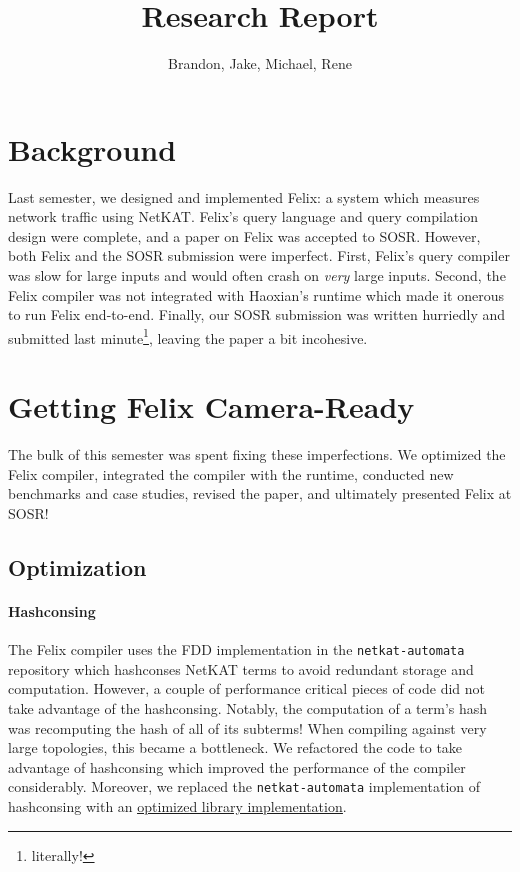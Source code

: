 \documentclass{hw}
\title{Research Report}
\author{Brandon, Jake, Michael, Rene}
\newcommand{\netauto}{\texttt{netkat-automata}}
\newcommand{\niceref}[2]{\underline{\textcolor{blue}{\href{#1}{#2}}}}
\begin{document}
\maketitle

\section{Background}
Last semester, we designed and implemented Felix: a system which measures
network traffic using NetKAT. Felix's query language and query compilation
design were complete, and a paper on Felix was accepted to SOSR. However,
both Felix and the SOSR submission were imperfect. First, Felix's query
compiler was slow for large inputs and would often crash on \emph{very} large
inputs. Second, the Felix compiler was not integrated with Haoxian's runtime
which made it onerous to run Felix end-to-end. Finally, our SOSR submission was
written hurriedly and submitted last minute\footnote{literally!}, leaving the
paper a bit incohesive.

\section{Getting Felix Camera-Ready}
The bulk of this semester was spent fixing these imperfections. We optimized
the Felix compiler, integrated the compiler with the runtime, conducted new
benchmarks and case studies, revised the paper, and ultimately presented Felix
at SOSR!

\subsection{Optimization}
\paragraph{Hashconsing}
The Felix compiler uses the FDD implementation in the \netauto{} repository
which hashconses NetKAT terms to avoid redundant storage and computation.
However, a couple of performance critical pieces of code did not take advantage
of the hashconsing. Notably, the computation of a term's hash was recomputing
the hash of all of its subterms! When compiling against very large topologies,
this became a bottleneck. We refactored the code to take advantage of
hashconsing which improved the performance of the compiler considerably.
Moreover, we replaced the \netauto{} implementation of hashconsing with an
\niceref{https://github.com/backtracking/ocaml-hashcons}{optimized library
implementation}.
\end{document}
